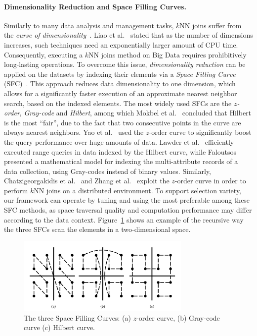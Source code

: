 \paragraph{Dimensionality Reduction and Space Filling Curves.} Similarly to many data analysis and management tasks, $k$NN joins suffer from the \textit{curse of dimensionality}~\cite{berchtold1998his}. Liao et al.~\cite{liao2001SFC} stated that as the number of dimensions increases, such techniques need an exponentially larger amount of CPU time. Consequently, executing a $k$NN joins method on Big Data requires prohibitively long-lasting operations. To overcome this issue, \textit{dimensionality reduction} can be applied on the datasets by indexing their elements via a \textit{Space Filling Curve} (SFC)~\cite{sagan2012space}. This approach reduces data dimensionality to one dimension, which allows for a significantly faster execution of an approximate nearest neighbor search, based on the indexed elements. The most widely used SFCs are the \textit{$z$-order}, \textit{Gray-code} and \textit{Hilbert}, among which Mokbel et al.~\cite{mokbel2002pms} concluded that Hilbert is the most ``fair'', due to the fact that two consecutive points in the curve are always nearest neighbors. Yao et al.~\cite{yao2010knn} used the $z$-order curve to significantly boost the query performance over huge amounts of data. Lawder et al.~\cite{lawder2001qmd} efficiently executed range queries in data indexed by the Hilbert curve, while Faloutsos~\cite{faloutsos1986mhu} presented a mathematical model for indexing the multi-attribute records of a data collection, using Gray-codes instead of binary values. Similarly, Chatzigeorgakidis et al.~\cite{chatzigeorgakidis2015mapreduce} and Zhang et al.~\cite{zhang2012epk} exploit the $z$-order curve in order to perform $k$NN joins on a distributed environment. To support selection variety, our framework can operate by tuning and using the most preferable among these SFC methods, as space traversal quality and computation performance may differ according to the data context. Figure~\ref{figure1} shows an example of the recursive way the three SFCs scan the elements in a two-dimensional space.

\begin{figure}[!t]
	\centering
	\includegraphics[width=0.75\textwidth]{figures/figure1.png}
	\caption{The three Space Filling Curves: (a) $z$-order curve, (b) Gray-code curve (c) Hilbert curve.}
	\label{figure1}
\end{figure}

